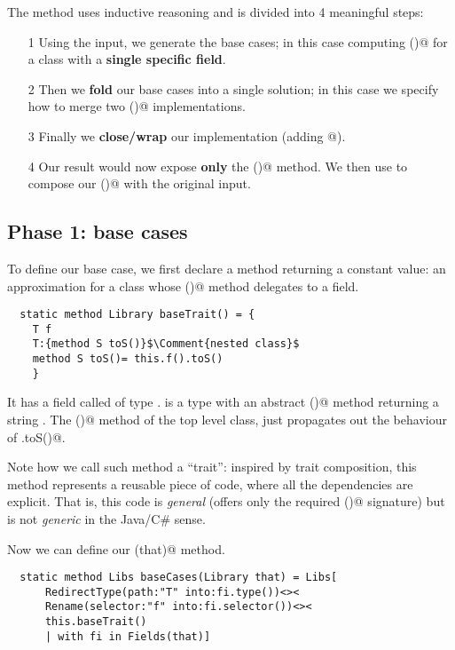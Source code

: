 The method uses inductive reasoning and is divided into 4 meaningful steps:
\begin{itemize}
\item[1] Using the input, we generate the base cases;
in this case computing \Q@toS()@ for a class with a \textbf{single specific field}.
\item[2] Then we  \textbf{fold} our base cases into a single solution; in this case we specify how to merge two \Q@toS()@ implementations.
\item[3] Finally we \textbf{close/wrap} our implementation (adding  \Q@[]@).
\item[4]
Our result \Q@res@ would now expose \textbf{only} the \Q@toS()@ method.
We then use \Q@Override@ to compose our \Q@toS()@ with the original input.
\end{itemize}



\subsection*{Phase 1: base cases}
To define our base case, we first 
 declare a method returning a constant \Q@Library@ value: an approximation for a class
 whose  \Q@toS()@ method delegates to a field.

\begin{lstlisting}
  static method Library baseTrait() = {
    T f
    T:{method S toS()}$\Comment{nested class}$
    method S toS()= this.f().toS()
    }
\end{lstlisting}

It has a field called \Q@f@ of type \Q@T@.
\Q@T@ is a type with an abstract \Q@toS()@ method returning a string \Q@S@.
The \Q@toS()@ method of the top level class, just propagates out
the behaviour of \Q@T.toS()@.

Note how we call such method a ``trait'': inspired by trait composition, 
this method represents a reusable piece of code, where all the dependencies are explicit.
That is, this code is \emph{general} (\Q@T@ offers only the required \Q@toS()@ signature)
but is not \emph{generic} in the Java/C\# sense.

Now we can define our \Q@baseCases(that)@ method.

\begin{lstlisting}
  static method Libs baseCases(Library that) = Libs[
      RedirectType(path:"T" into:fi.type())<><
      Rename(selector:"f" into:fi.selector())<><
      this.baseTrait()
      | with fi in Fields(that)]
\end{lstlisting}

